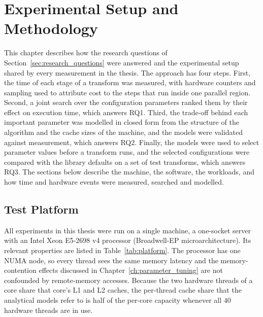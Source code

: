 \chapter{Experimental Setup and Methodology}
\label{ch:methodology}

This chapter describes how the research questions of Section~\ref{sec:research_questions} were answered and the experimental setup shared by every measurement in the thesis. The approach has four steps. First, the time of each stage of a transform was measured, with hardware counters and sampling used to attribute cost to the steps that run inside one parallel region. Second, a joint search over the configuration parameters ranked them by their effect on execution time, which answers RQ1. Third, the trade-off behind each important parameter was modelled in closed form from the structure of the algorithm and the cache sizes of the machine, and the models were validated against measurement, which answers RQ2. Finally, the models were used to select parameter values before a transform runs, and the selected configurations were compared with the library defaults on a set of test transforms, which answers RQ3. The sections below describe the machine, the software, the workloads, and how time and hardware events were measured, searched and modelled.

\section{Test Platform}
\label{sec:platform}

All experiments in this thesis were run on a single machine, a one-socket server with an Intel Xeon E5-2698 v4 processor (Broadwell-EP microarchitecture). Its relevant properties are listed in Table~\ref{tab:platform}. The processor has one NUMA node, so every thread sees the same memory latency and the memory-contention effects discussed in Chapter~\ref{ch:parameter_tuning} are not confounded by remote-memory accesses. Because the two hardware threads of a core share that core's L1 and L2 caches, the per-thread cache share that the analytical models refer to is half of the per-core capacity whenever all $40$ hardware threads are in use.

